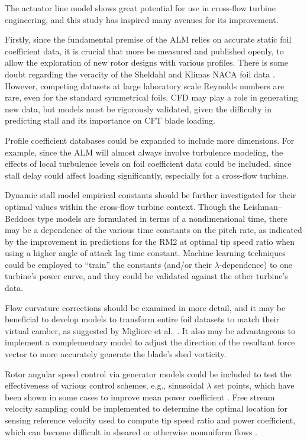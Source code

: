 The actuator line model shows great potential for use in cross-flow turbine
engineering, and this study has inspired many avenues for its improvement.

Firstly, since the fundamental premise of the ALM relies on accurate static foil
coefficient data, it is crucial that more be measured and published openly, to
allow the exploration of new rotor designs with various profiles. There is some
doubt regarding the veracity of the Sheldahl and Klimas NACA foil data
\cite{Bedon2014}. However, competing datasets at large laboratory scale Reynolds
numbers are rare, even for the standard symmetrical foils. CFD may play a role
in generating new data, but models must be rigorously validated, given the
difficulty in predicting stall and its importance on CFT blade loading.

Profile coefficient databases could be expanded to include more dimensions. For
example, since the ALM will almost always involve turbulence modeling, the
effects of local turbulence levels on foil coefficient data could be included,
since stall delay could affect loading significantly, especially for a
cross-flow turbine.

Dynamic stall model empirical constants should be further investigated for their
optimal values within the cross-flow turbine context. Though the
Leishman--Beddoes type models are formulated in terms of a nondimensional time,
there may be a dependence of the various time constants on the pitch rate, as
indicated by the improvement in predictions for the RM2 at optimal tip speed
ratio when using a higher angle of attack lag time constant. Machine learning
techniques could be employed to ``train'' the constants (and/or their
$\lambda$-dependence) to one turbine's power curve, and they could be validated
against the other turbine's data.

Flow curvature corrections should be examined in more detail, and it may be
beneficial to develop models to transform entire foil datasets to match their
virtual camber, as suggested by Migliore et al.~\cite{Migliore1980}. It
also may be advantageous to implement a complementary model to adjust the
direction of the resultant force vector to more accurately generate the blade's
shed vorticity.

Rotor angular speed control via generator models could be included to test the
effectiveness of various control schemes, e.g., sinusoidal $\lambda$ set points,
which have been shown in some cases to improve mean power coefficient
\cite{Strom2015}. Free stream velocity sampling could be implemented to
determine the optimal location for sensing reference velocity used to compute
tip speed ratio and power coefficient, which can become difficult in sheared or
otherwise nonuniform flows \cite{Forbush2015}.

